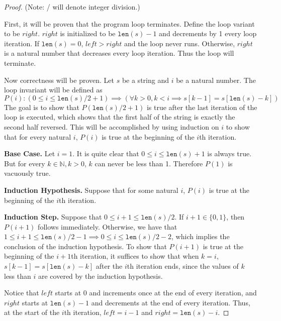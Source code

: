 \documentclass[11pt]{article}
\begin{document}
    \begin{proof}
        (Note: / will denote integer division.)

        First, it will be proven that the program loop terminates. Define the loop variant to be \(right\). \(right\) is initialized to be \(\texttt{len}(s) -1\) and decrements by 1 every loop iteration. If \(\texttt{len}(s) = 0\), \(left > right\) and the loop never runs. Otherwise, \(right\) is a natural number that decreases every loop iteration. Thus the loop will terminate.

        Now correctness will be proven. Let \(s\) be a string and \(i\) be a natural number. The loop invariant will be defined as
        \[
            P(i) \colon (0 \leq i \leq \texttt{len} (s)/2 + 1) \implies (\forall k > 0, k < i \implies s[k-1] = s[\texttt{len} (s) - k])
        \]
        The goal is to show that \(P(\texttt{len}(s)/2+1)\) is true after the last iteration of the loop is executed, which shows that the first half of the string is exactly the second half reversed. This will be accomplished by using induction on \(i\) to show that for every natural \(i\), \(P(i)\) is true at the beginning of the \(i\)th iteration.

        \textbf{Base Case.} Let \(i=1\). It is quite clear that \(0 \leq i \leq \texttt{len}(s)+1\) is always true. But for every \(k \in \mathbb{N}, k > 0\), \(k\) can never be less than 1. Therefore \(P(1)\) is vacuously true.

        \textbf{Induction Hypothesis.} Suppose that for some natural \(i\), \(P(i)\) is true at the beginning of the \(i\)th iteration.

        \textbf{Induction Step.} Suppose that \(0 \leq i+1 \leq \texttt{len}(s)/2\). If \(i+1 \in \{0, 1\}\), then \(P(i+1)\) follows immediately. Otherwise, we have that \(1 \leq i+1 \leq \texttt{len}(s)/2-1 \implies 0 \leq i \leq \texttt{len}(s) /2 -2\), which implies the conclusion of the induction hypothesis. To show that \(P(i+1)\) is true at the beginning of the \(i+1\)th iteration, it suffices to show that when \(k=i\), \(s[k-1]=s[\texttt{len}(s) - k]\) after the \(i\)th iteration ends, since the values of \(k\) less than \(i\) are covered by the induction hypothesis.

        Notice that \(left\) starts at 0 and increments once at the end of every iteration, and \(right\) starts at \(\texttt{len}(s) -1\) and decrements at the end of every iteration. Thus, at the start of the \(i\)th iteration, \(left=i-1\) and \(right=\texttt{len}(s) - i\).


\end{proof}
\end{document}
